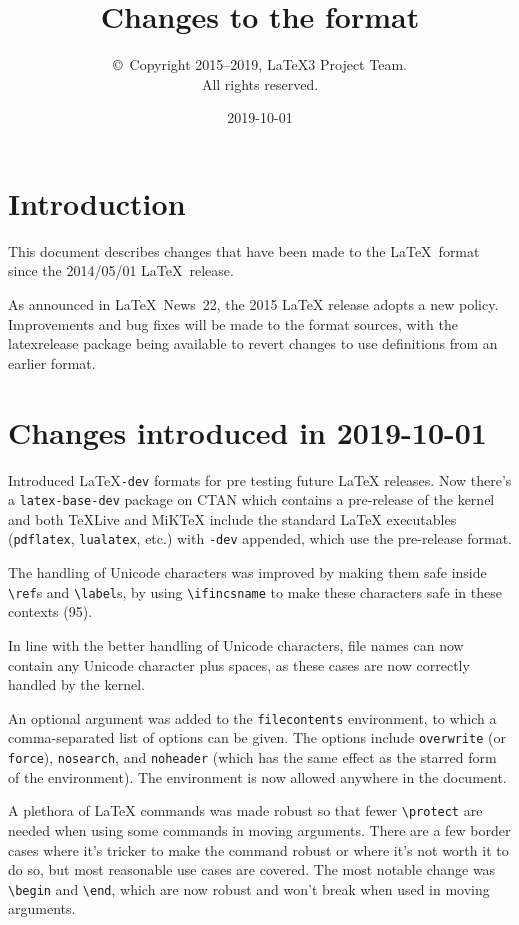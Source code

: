 \documentclass{ltxguide}
\title{Changes to the \LaTeXe{} format}
\author{\copyright~Copyright 2015--2019, \LaTeX3 Project Team.\\
   All rights reserved.}
\date{2019-10-01}
\newcommand\Lpack[1]{\mbox{\textsf{#1}}}
\newcommand\ghissue[1]{#1}
\newcommand\ltnewsissue[1]{\LaTeX\ News~#1}
\newcommand\ghissue[1]{%
    \href{https://github.com/latex3/latex2e/issues/#1}{#1}}
\newcommand\ltnewsissue[1]{%
    \href{https://www.latex-project.org/news/latex2e-news/ltnews#1.pdf}{\LaTeX\ News~#1}}
\begin{document}
 
\maketitle
 
\tableofcontents

\newpage
 
\section{Introduction}
 
This document describes changes that have been made to the
\LaTeX\ format since the 2014/05/01 \LaTeX\ release.


As announced in \ltnewsissue{22}, the 2015 \LaTeX{} release adopts a new
policy. Improvements and bug fixes will be made to the format sources,
with the \Lpack{latexrelease} package being available to revert
changes to use definitions from an earlier format.


\section{Changes introduced in 2019-10-01}

Introduced \LaTeX\texttt{-dev} formats for pre testing future \LaTeX{}
releases. Now there's a \texttt{latex-base-dev} package on CTAN which
contains a pre-release of the \LaTeXe{} kernel and both \TeX Live and
MiK\TeX{} include the standard \LaTeX{} executables (\texttt{pdflatex},
\texttt{lualatex}, etc.) with \texttt{-dev} appended, which use the
pre-release format.

The handling of Unicode characters was improved by making them safe
inside \verb|\ref|s and \verb|\label|s, by using \verb|\ifincsname|
to make these characters safe in these contexts (\ghissue{95}).

In line with the better handling of Unicode characters, file names
can now contain any Unicode character plus spaces, as these cases
are now correctly handled by the kernel.

An optional argument was added to the \texttt{filecontents} environment,
to which a comma-separated list of options can be given. The options
include \texttt{overwrite} (or \texttt{force}), \texttt{nosearch}, and
\texttt{noheader} (which has the same effect as the starred form of the
environment). The environment is now allowed anywhere in the document.

A plethora of \LaTeX{} commands was made robust so that fewer
\verb|\protect| are needed when using some commands in moving arguments.
There are a few border cases where it's tricker to make the command
robust or where it's not worth it to do so, but most reasonable use
cases are covered. The most notable change was \verb|\begin| and
\verb|\end|, which are now robust and won't break when used in moving
arguments.
\end{document}
